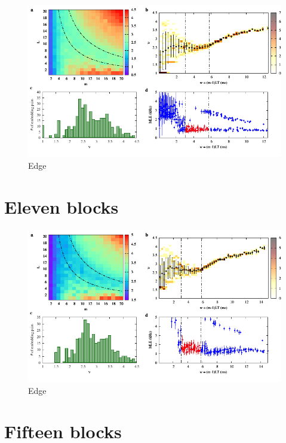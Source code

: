 \begin{figure}[H]
    \centering
    \includegraphics[width=\linewidth]{../10_blocks/2e5_points/plots/chaos_low.pdf}
    \caption{Edge}
    \label{fig:10 blocks chaos}
\end{figure}

\section{Eleven blocks}

\begin{figure}[H]
    \centering
    \includegraphics[width=\linewidth]{../11_blocks/edge/2e5_points/plots/chaos_low.pdf}
    \caption{Edge}
    \label{fig:11 blocks chaos}
\end{figure}

\section{Fifteen blocks}

